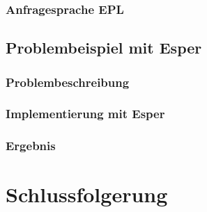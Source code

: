 \documentclass{acm_proc_article-sp}
\begin{document}
\subsubsection{Anfragesprache EPL}
\vspace{0.1cm}

%
%

\subsection{Problembeispiel mit Esper}
\vspace{0.1cm}
\subsubsection{Problembeschreibung}
\vspace{0.1cm}
\subsubsection{Implementierung mit Esper}
\vspace{0.1cm}
\subsubsection{Ergebnis}
\vspace{0.1cm}


%
%

\section{Schlussfolgerung}
\vspace{0.1cm}


\appendix
\vspace{0.1cm}
%

%
%

\end{document}
